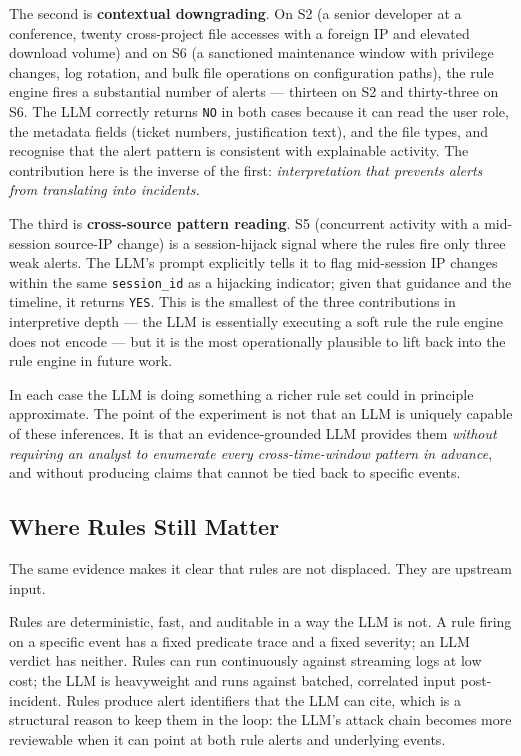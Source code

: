 \documentclass[conference]{IEEEtran}
\begin{document}
The second is \textbf{contextual downgrading}. On S2 (a senior developer at a conference, twenty cross-project file accesses with a foreign IP and elevated download volume) and on S6 (a sanctioned maintenance window with privilege changes, log rotation, and bulk file operations on configuration paths), the rule engine fires a substantial number of alerts --- thirteen on S2 and thirty-three on S6. The LLM correctly returns \texttt{NO} in both cases because it can read the user role, the metadata fields (ticket numbers, justification text), and the file types, and recognise that the alert pattern is consistent with explainable activity. The contribution here is the inverse of the first: \emph{interpretation that prevents alerts from translating into incidents.}

The third is \textbf{cross-source pattern reading}. S5 (concurrent activity with a mid-session source-IP change) is a session-hijack signal where the rules fire only three weak alerts. The LLM's prompt explicitly tells it to flag mid-session IP changes within the same \texttt{session\_id} as a hijacking indicator; given that guidance and the timeline, it returns \texttt{YES}. This is the smallest of the three contributions in interpretive depth --- the LLM is essentially executing a soft rule the rule engine does not encode --- but it is the most operationally plausible to lift back into the rule engine in future work.

In each case the LLM is doing something a richer rule set could in principle approximate. The point of the experiment is not that an LLM is uniquely capable of these inferences. It is that an evidence-grounded LLM provides them \emph{without requiring an analyst to enumerate every cross-time-window pattern in advance}, and without producing claims that cannot be tied back to specific events.

\subsection{Where Rules Still Matter}
\label{sec:rules-matter}

The same evidence makes it clear that rules are not displaced. They are upstream input.

Rules are deterministic, fast, and auditable in a way the LLM is not. A rule firing on a specific event has a fixed predicate trace and a fixed severity; an LLM verdict has neither. Rules can run continuously against streaming logs at low cost; the LLM is heavyweight and runs against batched, correlated input post-incident. Rules produce alert identifiers that the LLM can cite, which is a structural reason to keep them in the loop: the LLM's attack chain becomes more reviewable when it can point at both rule alerts and underlying events.
\end{document}
